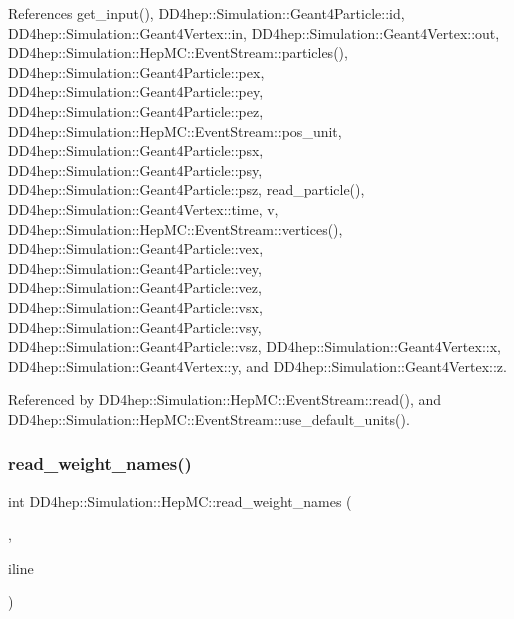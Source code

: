 References get\+\_\+input(), D\+D4hep\+::\+Simulation\+::\+Geant4\+Particle\+::id, D\+D4hep\+::\+Simulation\+::\+Geant4\+Vertex\+::in, D\+D4hep\+::\+Simulation\+::\+Geant4\+Vertex\+::out, D\+D4hep\+::\+Simulation\+::\+Hep\+M\+C\+::\+Event\+Stream\+::particles(), D\+D4hep\+::\+Simulation\+::\+Geant4\+Particle\+::pex, D\+D4hep\+::\+Simulation\+::\+Geant4\+Particle\+::pey, D\+D4hep\+::\+Simulation\+::\+Geant4\+Particle\+::pez, D\+D4hep\+::\+Simulation\+::\+Hep\+M\+C\+::\+Event\+Stream\+::pos\+\_\+unit, D\+D4hep\+::\+Simulation\+::\+Geant4\+Particle\+::psx, D\+D4hep\+::\+Simulation\+::\+Geant4\+Particle\+::psy, D\+D4hep\+::\+Simulation\+::\+Geant4\+Particle\+::psz, read\+\_\+particle(), D\+D4hep\+::\+Simulation\+::\+Geant4\+Vertex\+::time, v, D\+D4hep\+::\+Simulation\+::\+Hep\+M\+C\+::\+Event\+Stream\+::vertices(), D\+D4hep\+::\+Simulation\+::\+Geant4\+Particle\+::vex, D\+D4hep\+::\+Simulation\+::\+Geant4\+Particle\+::vey, D\+D4hep\+::\+Simulation\+::\+Geant4\+Particle\+::vez, D\+D4hep\+::\+Simulation\+::\+Geant4\+Particle\+::vsx, D\+D4hep\+::\+Simulation\+::\+Geant4\+Particle\+::vsy, D\+D4hep\+::\+Simulation\+::\+Geant4\+Particle\+::vsz, D\+D4hep\+::\+Simulation\+::\+Geant4\+Vertex\+::x, D\+D4hep\+::\+Simulation\+::\+Geant4\+Vertex\+::y, and D\+D4hep\+::\+Simulation\+::\+Geant4\+Vertex\+::z.



Referenced by D\+D4hep\+::\+Simulation\+::\+Hep\+M\+C\+::\+Event\+Stream\+::read(), and D\+D4hep\+::\+Simulation\+::\+Hep\+M\+C\+::\+Event\+Stream\+::use\+\_\+default\+\_\+units().

\hypertarget{namespace_d_d4hep_1_1_simulation_1_1_hep_m_c_a9a0a541fc8f48d5f9b80131b7f3b7e88}{}\label{namespace_d_d4hep_1_1_simulation_1_1_hep_m_c_a9a0a541fc8f48d5f9b80131b7f3b7e88} 
\subsubsection{\texorpdfstring{read\+\_\+weight\+\_\+names()}{read\_weight\_names()}}
{\footnotesize\ttfamily int D\+D4hep\+::\+Simulation\+::\+Hep\+M\+C\+::read\+\_\+weight\+\_\+names (\begin{DoxyParamCaption}\item[{\hyperlink{class_d_d4hep_1_1_simulation_1_1_hep_m_c_1_1_event_stream}{Event\+Stream} \&}]{,  }\item[{istringstream \&}]{iline }\end{DoxyParamCaption})}




